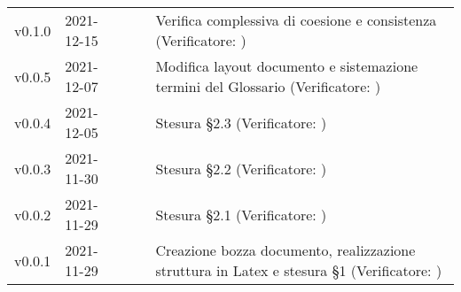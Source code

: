 \begin{longtable}{ m{}<{\centering}  m{}<{\centering}  m{}<{\centering}  m{}<{\centering}  m{}<{\centering} }
	v0.1.0 & 2021-12-15 & \FP{} & \AN{} & Verifica complessiva di coesione e consistenza (Verificatore: \textit{\PV})\\
	
	v0.0.5& 2021-12-07 & \GC{} & \AN{} & Modifica layout documento e sistemazione termini del Glossario (Verificatore: \textit{\PV{}})\\

	v0.0.4& 2021-12-05 & \LW{} & \AN{} & Stesura §2.3 (Verificatore: \textit{\PV{}})\\

	v0.0.3& 2021-11-30 & \GC & \AN{} & Stesura §2.2 (Verificatore: \textit{\PV{}})\\

	v0.0.2& 2021-11-29 & \FP{} & \AN{} & Stesura §2.1 (Verificatore: \textit{\PV{}})\\

	v0.0.1& 2021-11-29 & \LW{} & \AN{} & Creazione bozza documento, realizzazione struttura in Latex e stesura §1 (Verificatore: \textit{\PV{}})\\

\end{longtable}

\pagebreak